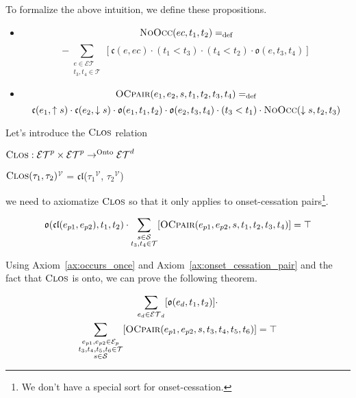 To formalize the above intuition, we define these propositions.
\begin{itemize}
    \item \[\textsc{NoOcc}(ec, t_1, t_2) =_{\text{def}}\]
          \[ -\sum_{\substack{{e \in \mathcal{ET}} \\ t_3, t_4 \in \mathcal{T}}}
              [\mathfrak{c}(e, ec) \cdot (t_1 < t_3) \cdot (t_4 < t_2) \cdot \mathfrak{o}(e, t_3, t_4)]\]
    \item \[
              \textsc{OCpair}(e_1, e_2, s, t_1, t_2, t_3, t_4) =_{\text{def}}
          \]
          \[
              \mathfrak{c}(e_1, \uparrow s) \cdot \mathfrak{c}(e_2, \downarrow s) \cdot \mathfrak{o}(e_1, t_1, t_2) \cdot \mathfrak{o}(e_2, t_3, t_4) \cdot (t_3 < t_1) \cdot \textsc{NoOcc}(\downarrow s, t_2, t_3)
          \]
\end{itemize}

Let's introduce the $\textsc{Clos}$ relation

\begin{defn}
    $\textsc{Clos} : \mathcal{ET}^p \times \mathcal{ET}^p \to^{\text{Onto}} \mathcal{ET}^d$
\end{defn}

\begin{defn}
    \textlbrackdbl $\textsc{Clos}(\tau_1, \tau_2)$\textrbrackdbl$^{\mathcal{V}}$ = $\mathfrak{cl}$(\textlbrackdbl $\tau_1$\textrbrackdbl$^{\mathcal{V}}$, \textlbrackdbl $\tau_2$\textrbrackdbl$^{\mathcal{V}}$)
\end{defn}

we need to axiomatize  $\textsc{Clos}$  so that it only applies to onset-cessation pairs\footnote{We don't have a special sort for onset-cessation.}.

\begin{axiom}\label{ax:onset_cessation_pair}
    \begin{equation}
        \mathfrak{o}(\mathfrak{cl}(e_{p1}, e_{p2}), t_1, t_2) \cdot \sum_{\substack{s \in \mathcal{S} \\ t_3, t_4 \in \mathcal{T}}}[ \textsc{OCpair}(e_{p1}, e_{p2}, s, t_1, t_2, t_3, t_4) ] = \top
    \end{equation}
\end{axiom}

Using Axiom~\ref{ax:occurs_once} and Axiom~\ref{ax:onset_cessation_pair} and the fact that $\textsc{Clos}$ is onto, we can prove the following theorem.

\begin{theorem}\label{thm:durative_events_temporal_pattern}
    \begin{equation}
        \begin{gathered}
            \sum_{e_d \in \mathcal{ET}_d}[\mathfrak{o}(e_d, t_1, t_2)] \cdot  \\
            \sum_{\substack{e_{p1}, e_{p2} \in \mathcal{E}_p \\ t_3, t_4, t_5, t_6 \in \mathcal{T} \\ s \in \mathcal{S}}}[
                \textsc{OCpair}(e_{p1}, e_{p2}, s, t_3, t_4, t_5, t_6)
            ] = \top
        \end{gathered}
    \end{equation}
\end{theorem}

